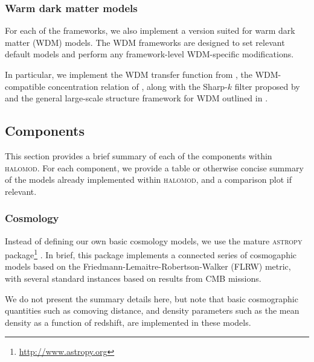 \documentclass[5p,aas_macros]{elsarticle}
\newcommand{\ztc}[1]{\textcolor{cyan}{\textbf{[ZTC: #1]}}}
\begin{document}
\subsubsection{Warm dark matter models}
\label{sec:halomod:frameworks:wdm}
For each of the frameworks, we also implement a version suited for warm dark matter (WDM) models. The WDM frameworks are designed to set relevant default models and perform any framework-level WDM-specific modifications.

In particular, we implement the WDM transfer function from \cite{Viel2005}, the WDM-compatible concentration relation of \cite{Ludlow2016}, along with the Sharp-$k$ filter proposed by \cite{Schneider2012} and the general large-scale structure framework for WDM outlined in \cite{Smith2011a}.

\subsection{Components}
\label{sec:halomod:components}
This section provides a brief summary of each of the components within \textsc{halomod}. 
For each component, we provide a table or otherwise concise summary of the models already implemented within \textsc{halomod}, and a comparison plot if relevant. 


\subsubsection{Cosmology}
\label{sec:halomod:components:cosmology}
Instead of defining our own basic cosmology models, we use the mature \textsc{astropy} package\footnote{\url{http://www.astropy.org}} \citep{Robitaille2013}. In brief, this package implements a connected series of cosmogaphic models based on the Friedmann-Lemaitre-Robertson-Walker (FLRW) metric, with several standard instances based on results from CMB missions. 

We do not present the summary details here, but note that basic cosmographic quantities such as comoving distance, and density parameters such as the mean density as a function of redshift, are implemented in these models. 
\end{document}
